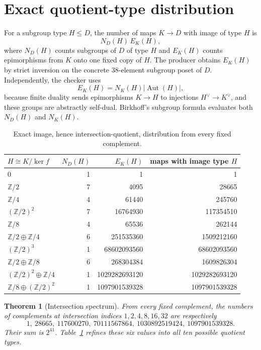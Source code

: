 \documentclass[10pt]{article}
\newtheorem{theorem}{Theorem}
\newcommand{\Z}{\mathbb Z}
\begin{document}
\section{Exact quotient-type distribution}
For a subgroup type $H\leq D$, the number of maps $K\to D$ with image of type
$H$ is
\begin{equation}\label{eq:imagecount}
 N_D(H)\,E_K(H),
\end{equation}
where $N_D(H)$ counts subgroups of $D$ of type $H$ and $E_K(H)$ counts
epimorphisms from $K$ onto one fixed copy of $H$.  The producer obtains
$E_K(H)$ by strict inversion on the concrete 38-element subgroup poset of
$D$.  Independently, the checker uses
\[
 E_K(H)=N_K(H)|\operatorname{Aut}(H)|,
\]
because finite duality sends epimorphisms $K\to H$ to injections
$H^\vee\to K^\vee$, and these groups are abstractly self-dual.  Birkhoff's
subgroup formula evaluates both $N_D(H)$ and $N_K(H)$.

\begin{table}[htbp]
\centering
\small
\begin{tabular}{lrrr}
\toprule
$H\cong K/\ker f$ & $N_D(H)$ & $E_K(H)$ & maps with image type $H$\\
\midrule
$0$ & 1 & 1 & 1\\
$\Z/2$ & 7 & 4095 & 28665\\
$\Z/4$ & 4 & 61440 & 245760\\
$(\Z/2)^2$ & 7 & 16764930 & 117354510\\
$\Z/8$ & 4 & 65536 & 262144\\
$\Z/2\oplus\Z/4$ & 6 & 251535360 & 1509212160\\
$(\Z/2)^3$ & 1 & 68602093560 & 68602093560\\
$\Z/2\oplus\Z/8$ & 6 & 268304384 & 1609826304\\
$(\Z/2)^2\oplus\Z/4$ & 1 & 1029282693120 & 1029282693120\\
$\Z/8\oplus(\Z/2)^2$ & 1 & 1097901539328 & 1097901539328\\
\bottomrule
\end{tabular}
\caption{Exact image, hence intersection-quotient, distribution from every
fixed complement.}
\label{tab:types}
\end{table}

\begin{theorem}[Intersection spectrum]
From every fixed complement, the numbers of complements at intersection
indices $1,2,4,8,16,32$ are respectively
\[
 1,\ 28665,\ 117600270,\ 70111567864,\
 1030892519424,\ 1097901539328.
\]
Their sum is $2^{41}$.  Table~\ref{tab:types} refines these six values into
all ten possible quotient types.
\end{theorem}
\end{document}
